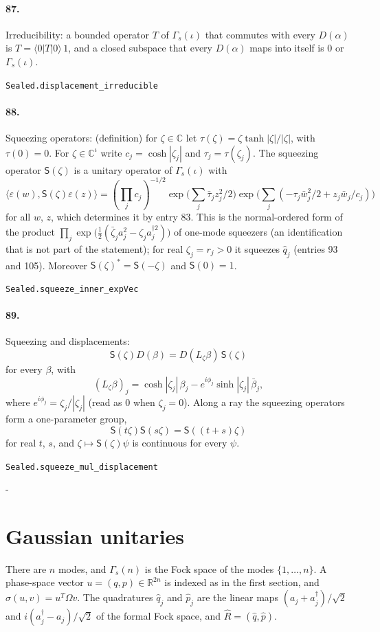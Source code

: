 \documentclass[11pt]{article}
\makeatletter
\newcommand{\keepspace}[1]{\par\penalty-100\begingroup\setlength{\dimen@}{#1}\dimen@ii\pagegoal\advance\dimen@ii-\pagetotal\ifdim\dimen@>\dimen@ii\ifdim\dimen@ii>\z@\vfil\fi\break\fi\endgroup}
\makeatother
\begin{document}
\paragraph{87.} Irreducibility: a bounded operator $T$ of $\Gamma_s(\iota)$ that commutes with every $D(\alpha)$ is $T = \langle 0|T|0\rangle\, 1$, and a closed subspace that every $D(\alpha)$ maps into itself is $0$ or $\Gamma_s(\iota)$.\par{\footnotesize\texttt{Sealed.displacement\_irreducible}}

\paragraph{88.} Squeezing operators: (definition) for $\zeta \in \mathbb C$ let $\tau(\zeta) = \zeta \tanh|\zeta| / |\zeta|$, with $\tau(0) = 0$. For $\zeta \in \mathbb C^\iota$ write $c_j = \cosh|\zeta_j|$ and $\tau_j = \tau(\zeta_j)$. The squeezing operator $\mathsf S(\zeta)$ is a unitary operator of $\Gamma_s(\iota)$ with \[\langle \varepsilon(w), \mathsf S(\zeta)\varepsilon(z)\rangle = (\prod_j c_j)^{-1/2} \exp\big(\sum_j \bar\tau_j z_j^2/2\big) \exp\big(\sum_j (-\tau_j \bar w_j^2/2 + z_j \bar w_j / c_j)\big)\] for all $w$, $z$, which determines it by entry 83. This is the normal-ordered form of the product $\prod_j \exp\big(\frac12 (\bar\zeta_j a_j^2 - \zeta_j a_j^{\dagger 2})\big)$ of one-mode squeezers (an identification that is not part of the statement); for real $\zeta_j = r_j > 0$ it squeezes $\hat q_j$ (entries 93 and 105). Moreover $\mathsf S(\zeta)^* = \mathsf S(-\zeta)$ and $\mathsf S(0) = 1$.\par{\footnotesize\texttt{Sealed.squeeze\_inner\_expVec}}

\paragraph{89.} Squeezing and displacements: \[\mathsf S(\zeta) D(\beta) = D(L_\zeta\beta)\, \mathsf S(\zeta)\] for every $\beta$, with \[(L_\zeta\beta)_j = \cosh|\zeta_j|\, \beta_j - e^{i\phi_j} \sinh|\zeta_j|\, \bar\beta_j,\] where $e^{i\phi_j} = \zeta_j/|\zeta_j|$ (read as $0$ when $\zeta_j = 0$). Along a ray the squeezing operators form a one-parameter group, \[\mathsf S(t\zeta) \mathsf S(s\zeta) = \mathsf S((t + s)\zeta)\] for real $t$, $s$, and $\zeta \mapsto \mathsf S(\zeta)\psi$ is continuous for every $\psi$.\par{\footnotesize\texttt{Sealed.squeeze\_mul\_displacement}}

\keepspace{14\baselineskip}\section*{Gaussian unitaries}
There are $n$ modes, and $\Gamma_s(n)$ is the Fock space of the modes $\{1, \dots, n\}$. A phase-space vector $u = (q, p) \in \mathbb R^{2n}$ is indexed as in the first section, and $\sigma(u, v) = u^T \Omega v$. The quadratures $\hat q_j$ and $\hat p_j$ are the linear maps $(a_j + a_j^\dagger)/\sqrt2$ and $i(a_j^\dagger - a_j)/\sqrt2$ of the formal Fock space, and $\hat R = (\hat q, \hat p)$.
\end{document}
